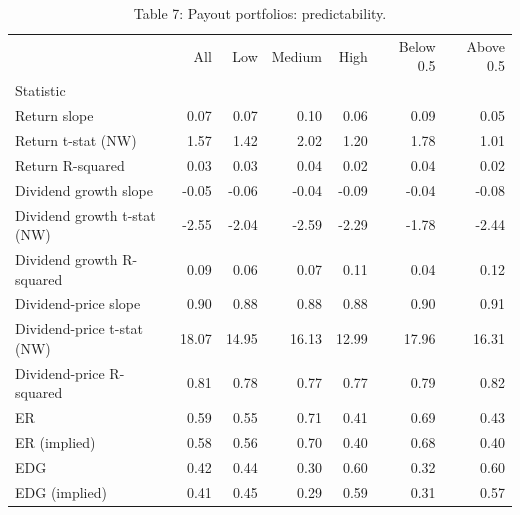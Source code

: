 \begin{table}
\caption{Table 7: Payout portfolios: predictability.}
\label{tab:replication_7}
\begin{tabular}{lrrrrrr}
\toprule
 & All & Low & Medium & High & Below 0.5 & Above 0.5 \\
Statistic &  &  &  &  &  &  \\
\midrule
Return slope & 0.07 & 0.07 & 0.10 & 0.06 & 0.09 & 0.05 \\
Return t-stat (NW) & 1.57 & 1.42 & 2.02 & 1.20 & 1.78 & 1.01 \\
Return R-squared & 0.03 & 0.03 & 0.04 & 0.02 & 0.04 & 0.02 \\
Dividend growth slope & -0.05 & -0.06 & -0.04 & -0.09 & -0.04 & -0.08 \\
Dividend growth t-stat (NW) & -2.55 & -2.04 & -2.59 & -2.29 & -1.78 & -2.44 \\
Dividend growth R-squared & 0.09 & 0.06 & 0.07 & 0.11 & 0.04 & 0.12 \\
Dividend-price slope & 0.90 & 0.88 & 0.88 & 0.88 & 0.90 & 0.91 \\
Dividend-price t-stat (NW) & 18.07 & 14.95 & 16.13 & 12.99 & 17.96 & 16.31 \\
Dividend-price R-squared & 0.81 & 0.78 & 0.77 & 0.77 & 0.79 & 0.82 \\
ER & 0.59 & 0.55 & 0.71 & 0.41 & 0.69 & 0.43 \\
ER (implied) & 0.58 & 0.56 & 0.70 & 0.40 & 0.68 & 0.40 \\
EDG & 0.42 & 0.44 & 0.30 & 0.60 & 0.32 & 0.60 \\
EDG (implied) & 0.41 & 0.45 & 0.29 & 0.59 & 0.31 & 0.57 \\
\bottomrule
\end{tabular}
\end{table}
